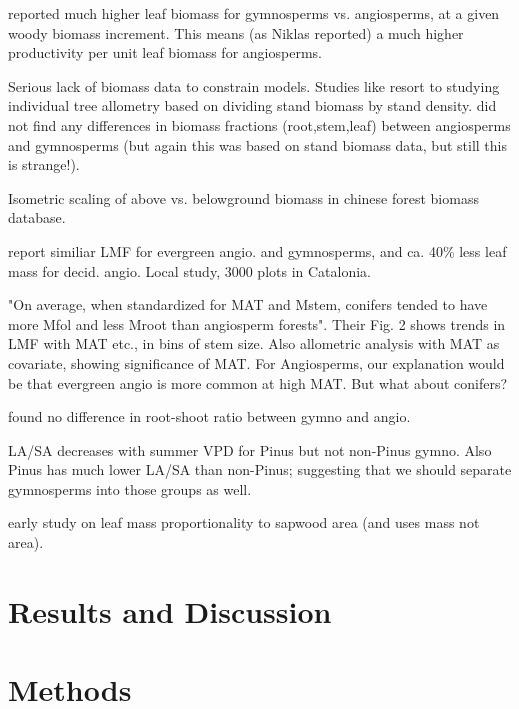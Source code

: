 \documentclass[a4paper]{article}
\begin{document}
\cite{oneill_comparative_1981} reported much higher leaf biomass for gymnosperms vs. angiosperms, at a given woody biomass increment. This means (as Niklas reported) a much higher productivity per unit leaf biomass for angiosperms.

Serious lack of biomass data to constrain models. Studies like \cite{wolf_forest_2011} resort to studying individual tree allometry based on dividing stand biomass by stand density. \cite{wolf_allometric_2010} did not find any differences in biomass fractions (root,stem,leaf) between angiosperms and gymnosperms (but again this was based on stand biomass data, but still this is strange!).

\cite{hui_near_2014} Isometric scaling of above vs. belowground biomass in chinese forest biomass database.

\cite{sardans_tree_2013} report similiar LMF for evergreen angio. and gymnosperms, and ca. 40\% less leaf mass for decid. angio. Local study, 3000 plots in Catalonia.

\cite{reich_temperature_2014} "On average, when standardized for MAT and Mstem, conifers tended to have more Mfol and less Mroot than angiosperm forests". Their Fig. 2 shows trends in LMF with MAT etc., in bins of stem size. Also allometric analysis with MAT as covariate, showing significance of MAT. For Angiosperms, our explanation would be that evergreen angio is more common at high MAT. But what about conifers?

\cite{cairns_root_1997} found no difference in root-shoot ratio between gymno and angio.

\cite{delucia_climate-driven_2000} LA/SA decreases with summer VPD for Pinus but not non-Pinus gymno. Also Pinus has much lower LA/SA than non-Pinus; suggesting that we should separate gymnosperms into those groups as well.

\cite{grier_notes:_1974} early study on leaf mass proportionality to sapwood area (and uses mass not area).

\section{Results and Discussion}








\section{Methods}
\end{document}
